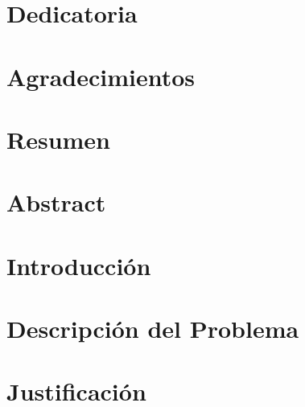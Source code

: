 \documentclass{thesis-tg-ie-pujc} %
\begin{document}
\maketitle
\makecoverletter

\chapter*{Dedicatoria}


\chapter*{Agradecimientos }


\chapter*{Resumen}


\chapter*{Abstract}



\tableofcontents
\listoffigures


\cleardoublepage
\dominitoc
\mainmatter

\chapter{Introducción}


\chapter{Descripción del Problema}


\chapter{Justificación}

\end{document}
